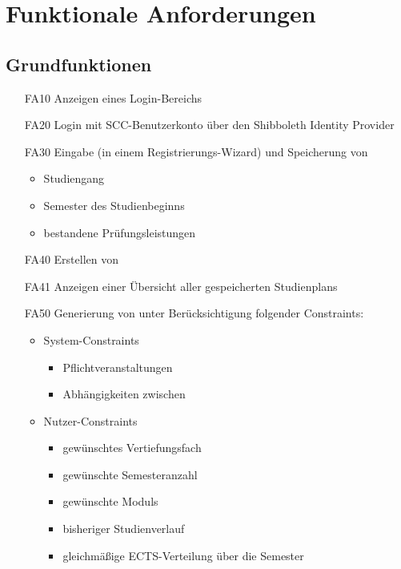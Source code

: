\section{Funktionale Anforderungen}

	\subsection{Grundfunktionen}
	\begin{itemize}[nosep]	
		\item [FA10] Anzeigen eines Login-Bereichs
		\item [FA20] Login mit \gls{SCC}-Benutzerkonto über den \gls{Shibboleth Identity Provider}
		\item [FA30]Eingabe (in einem Registrierungs-\gls{Wizard}) und Speicherung von
		\begin{itemize}[nosep]
			\item Studiengang
			\item \gls {Semester des Studienbeginns}
			\item bestandene Prüfungsleistungen
		\end{itemize}
		\item [FA40] Erstellen von 
		\item [FA41]Anzeigen einer Übersicht aller gespeicherten \glspl{Studienplan}
		\item [FA50] Generierung von  unter Berücksichtigung folgender \glspl{Constraint}:
			\begin{itemize}[nosep]
				\item \glspl{System-Constraint}
				\begin{itemize}[nosep]
					\item Pflichtveranstaltungen
					\item Abhängigkeiten zwischen 
				\end{itemize}
				\item \glspl{Nutzer-Constraint}
				\begin{itemize}[nosep]
					\item gewünschtes Vertiefungsfach
					\item gewünschte Semesteranzahl
					\item gewünschte \glspl{Modul}
					\item  bisheriger Studienverlauf
					\item gleichmäßige ECTS-Verteilung über die Semester
				\end{itemize}

\end{itemize}
\end{itemize}
